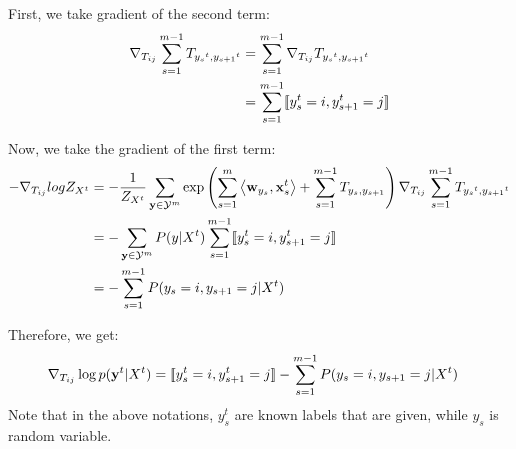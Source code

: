 \documentclass[11pt]{report}
\begin{document}
\begin{itemize}
 	First, we take gradient of the second term: 
	\begin{align}
		{\nabla}_{T_{ij}} \sum_{s=1}^{m-1} T_{{y_s}^t, {y_{s+1}}^t} &= \sum_{s=1}^{m-1} {\nabla}_{T_{ij}} T_{{y_s}^t, {y_{s+1}}^t} \\
		&= \sum_{s=1}^{m-1} [\![{y^t_s} = i, y^t_{s+1} = j]\!]
	\end{align}

 	Now, we take the gradient of the first term: 
	\begin{align}
		-{\nabla}_{T_{ij}} logZ_{X^t} &= -\frac{1}{Z_{X^t}} \sum_{\mathbf{\boldsymbol{y}} \in \mathcal{Y}^m}\exp \left(\sum_{s=1}^m \left\langle \mathbf{\boldsymbol{w}}_{y_s},\mathbf{\boldsymbol{x}}_s^t \right\rangle + \sum_{s=1}^{m-1} T_{y_s, y_{s+1}}\right) {\nabla}_{T_{ij}} \sum_{s=1}^{m-1} T_{{y_s}^t, {y_{s+1}}^t} \\
		&= -\sum_{\mathbf{\boldsymbol{y}} \in \mathcal{Y}^m}P(y|X^t) \sum_{s=1}^{m-1} [\![y^t_s = i, y^t_{s+1} = j]\!] \\
		&= -\sum_{s=1}^{m-1} P(y_s = i, y_{s+1} = j|X^t)
	\end{align}

	Therefore, we get: 
	\begin{align}
		{\nabla}_{T_{ij}} \log p(\mathbf{\boldsymbol{y}}^t|X^t) &= [\![y^t_s = i, y^t_{s+1} = j]\!] - \sum_{s=1}^{m-1} P(y_s = i, y_{s+1} = j|X^t)
	\end{align}
	Note that in the above notations, $y^t_s$ are known labels that are given, while $y_s$ is random variable. 
\end{itemize}
\end{document}
